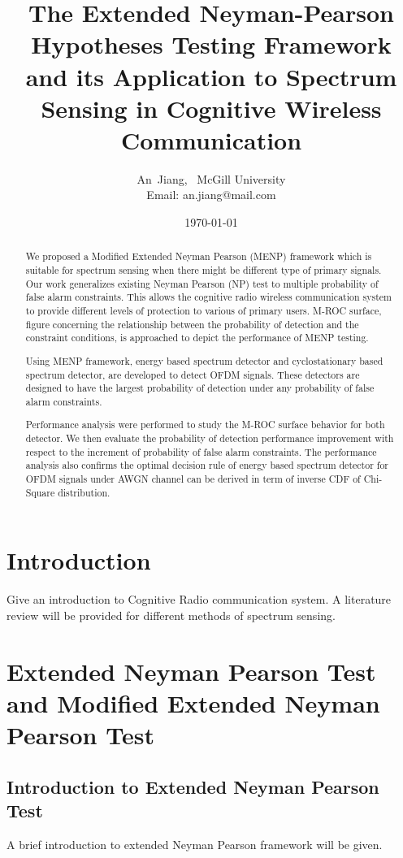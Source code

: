 \documentclass{report}
\author{An~Jiang,~
          McGill University\\
          Email: an.jiang@mail.com}
\title{The Extended Neyman-Pearson Hypotheses Testing Framework and its Application to Spectrum Sensing in Cognitive Wireless Communication}
\date{\today}
\begin{document}
\begin{spacing}{2.0}
\maketitle
\begin{abstract}
We proposed a Modified Extended Neyman Pearson (MENP) framework which is suitable for spectrum sensing when there might be different type of primary signals. Our work generalizes existing Neyman Pearson (NP) test to multiple probability of false alarm constraints. This allows the cognitive radio wireless communication system to provide different levels of protection to various of primary users.  
M-ROC surface, figure concerning the relationship between the probability of detection and the constraint conditions, is approached to depict the performance of MENP testing.   

Using MENP framework, energy based spectrum detector and cyclostationary based spectrum detector, are developed to detect OFDM signals. These detectors are designed to have the largest probability of detection under any probability of false alarm constraints.  

Performance analysis were performed to study the M-ROC surface behavior for both detector. We then evaluate the probability of detection performance improvement with respect to the increment of probability of false alarm constraints.  
The performance analysis also confirms the optimal decision rule of energy based spectrum detector for OFDM signals under AWGN channel can be derived in term of inverse CDF of Chi-Square distribution.  
\end{abstract}

\chapter{Introduction}
Give an introduction to Cognitive Radio communication system. A literature review will be provided for different methods of spectrum sensing.  
\chapter{Extended Neyman Pearson Test and Modified Extended Neyman Pearson Test}
\section{Introduction to Extended Neyman Pearson Test}
A brief introduction to extended Neyman Pearson framework will be given.

\end{spacing}
\end{document}
